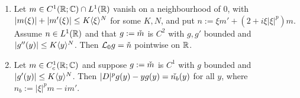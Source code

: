 \begin{lemma}
  \label{lem:c04_weak_L0}
  \begin{enumerate}
    \item Let $m\in C^1(\R;\C)\cap L^1(\R)$ vanish on a neighbourhood of $0$, with $|m(\xi)|+|m'(\xi)|\le K\ang\xi^{N}$
      for some $K,N$, and put $n:=\xi m'+(2+i\xi|\xi|^p)m$. Assume $n\in L^1(\R)$ and that $g:=\widecheck m$ is
      $C^2$ with $g,g'$ bounded and $|g''(y)|\le K\ang y^N$. Then $\mc L_0g=\widecheck n$ pointwise on $\R$.
    \item Let $m\in C^1_c(\R;\C)$ and suppose $g:=\widecheck m$ is $C^1$ with $g$ bounded and
      $|g'(y)|\le K\ang y^N$. Then $|D|^pg(y)-yg(y)=\widecheck{n_b}(y)$ for all $y$, where
      $n_b:=|\xi|^pm-im'$.
  \end{enumerate}
\end{lemma}
